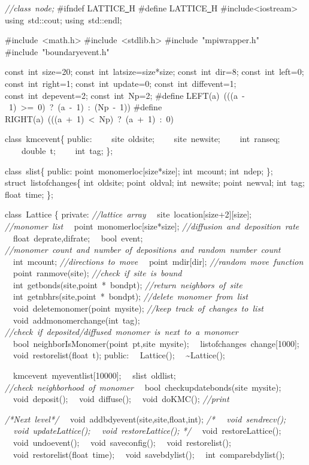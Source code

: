 {\ttfamily \raggedright \footnotesize
\textsl{//class\ node;}
\#ifndef LATTICE\underline\ H
\#define LATTICE\underline\ H
\#include<{}iostream>{}
using\ std::cout;
using\ std::endl;

\#include\ <{}math.h>{}
\#include\ <{}stdlib.h>{}
\#include\ "{}mpiwrapper.h"{}
\#include\ "{}boundaryevent.h"{}

const\ int\ size=20;
const\ int\ latsize=size*size;
const\ int\ dir=8;
const\ int\ left=0;
const\ int\ right=1;
const\ int\ update=0;
const\ int\ diffevent=1;
const\ int\ depevent=2;
const\ int\ Np=2;
\#define LEFT(a)\ (((a\ -{}\ 1)\ >{}=\ 0)\ ?\ (a\ -{}\ 1)\ :\ (Np\ -{}\ 1))
\#define RIGHT(a)\ (((a\ +\ 1)\ <{}\ Np)\ ?\ (a\ +\ 1)\ :\ 0)


class\ kmcevent\{
public:
\ \ \ \ site\ oldsite;
\ \ \ \ site\ newsite;
\ \ \ \ int\ ranseq;
\ \ \ \ double\ t;
\ \ \ \ int\ tag;
\};

class\ slist\{
public:
point\ monomerloc[size*size];
int\ mcount;
int\ ndep;
\};
struct\ listofchanges\{
int\ oldsite;
point\ oldval;
int\ newsite;
point\ newval;
int\ tag;
float\ time;
\};

class\ Lattice
\{
private:
\textsl{//lattice\ array}
\ \ site\ location[size+2][size];
\textsl{//monomer\ list}
\ \ point\ monomerloc[size*size];
\textsl{//diffusion\ and\ deposition\ rate}
\ \ float\ deprate,difrate;
\ \ bool\ event;
\textsl{//monomer\ count\ and\ number\ of\ depositions\ and\ random\ number\ count}
\ \ int\ mcount;
\textsl{//directions\ to\ move}
\ \ point\ mdir[dir];
\textsl{//random\ move\ function}
\ \ point\ ranmove(site);
\textsl{//check\ if\ site\ is\ bound}
\ \ int\ getbonds(site,point\ *\ bondpt);
\textsl{//return\ neighbors\ of\ site}
\ \ int\ getnbhrs(site,point\ *\ bondpt);
\textsl{//delete\ monomer\ from\ list\ \ }
\ \ void\ deletemonomer(point\ mysite);
\textsl{//keep\ track\ of\ changes\ to\ list}
\ \ void\ addmonomerchange(int\ tag);
\textsl{//check\ if\ deposited/diffused\ monomer\ is\ next\ to\ a\ monomer}
\ \ bool\ neighborIsMonomer(point\ pt,site\ mysite);
\ \ listofchanges\ change[1000];
\ \ void\ restorelist(float\ t);
public:
\ \ Lattice();
\ \ \textasciitilde Lattice();

\ \ kmcevent\ myeventlist[10000];
\ \ slist\ oldlist;
\textsl{//check\ neighborhood\ of\ monomer}
\ \ bool\ checkupdatebonds(site\ mysite);
\ \ void\ deposit();
\ \ void\ diffuse();
\ \ void\ doKMC();
\textsl{//print}

\textsl{/*Next\ level*/}
\ \ void\ addbdyevent(site,site,float,int);
\textsl{/*
\ \ void\ sendrecv();
\ \ void\ updateLattice();
\ \ void\ restoreLattice();
*/}
\ \ void\ restoreLattice();
\ \ void\ undoevent();
\ \ void\ saveconfig();
\ \ void\ restorelist();
\ \ void\ restorelist(float\ time);
\ \ void\ savebdylist();
\ \ int\ comparebdylist();

}
